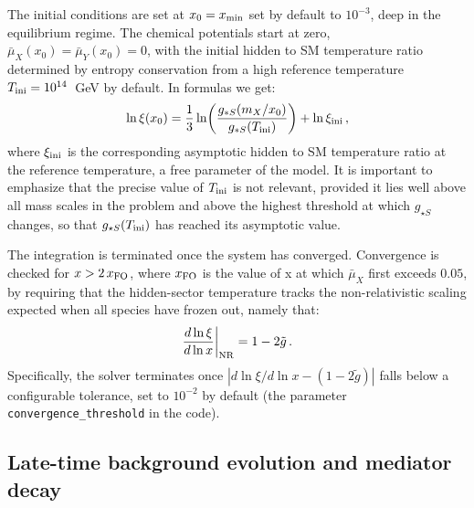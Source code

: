 \documentclass[11pt]{article}
\numberwithin{equation}{section}
\begin{document}
The initial conditions are set at $x_0 = x_{\rm min}$ set by default to $10^{-3}$, deep in the equilibrium regime. The chemical potentials start at zero, $\bar\mu_X(x_0) = \bar\mu_Y(x_0) = 0$, with the initial hidden to SM temperature ratio determined by entropy conservation from a high reference temperature $T_{\rm ini}=10^{14}$~GeV by default. In formulas we get:
\begin{equation}
  \ln\xi(x_0) = \frac{1}{3}\ln\!\left(\frac{g_{*S}(m_X/x_0)}{g_{*S}(T_{\rm ini})}\right) + \ln\xi_{\rm ini}\,,
  \label{eq:xi_init}
\end{equation}
where $\xi_{\rm ini}$ is the corresponding asymptotic hidden to SM temperature ratio at the reference temperature, a free parameter of the model. It is important to emphasize that the precise value of $T_{\rm ini}$ is not relevant, provided it lies well above all mass scales in the problem and above the highest threshold at which $g_{\star S}$ changes, so that $g_{\star S}(T_{\rm ini})$ has reached its asymptotic value.

The integration is terminated once the system has converged. Convergence is checked for $x > 2\,x_{\rm FO}$, where $x_{\rm FO}$ is the value of x
at which $\bar\mu_X$ first exceeds $0.05$, by requiring that the hidden-sector temperature tracks the non-relativistic scaling expected when all species have frozen out, namely that:
\begin{equation}
  \frac{d\ln\xi}{d\ln x}\bigg|_{\rm NR} = 1 - 2\tilde g\,.
  \label{eq:dlnxi_NR}
\end{equation}
Specifically, the solver terminates once $|d\ln\xi/d\ln x - (1-2\tilde g)|$ falls below a configurable tolerance, set to $10^{-2}$ by default (the parameter \texttt{convergence\_threshold} in the code).

\subsection{Late-time background evolution and mediator decay}
\label{sec:background}
\end{document}
